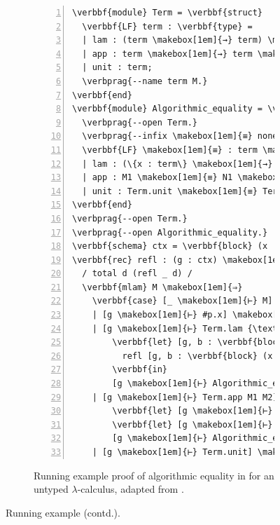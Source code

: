 \begin{figure}\ContinuedFloat
\begin{subfigure}{\linewidth}
\begin{Verbatim}[commandchars=\\\{\}, baselinestretch=1, numbers=left]
\verbbf{module} Term = \verbbf{struct}
  \verbbf{LF} term : \verbbf{type} =
  | lam : (term \makebox[1em]{→} term) \makebox[1em]{→} term
  | app : term \makebox[1em]{→} term \makebox[1em]{→} term
  | unit : term;
  \verbprag{--name term M.}
\verbbf{end}
\verbbf{module} Algorithmic_equality = \verbbf{struct}
  \verbprag{--open Term.}
  \verbprag{--infix \makebox[1em]{≡} none.}
  \verbbf{LF} \makebox[1em]{≡} : term \makebox[1em]{→} term \makebox[1em]{→} \verbbf{type} =
  | lam : (\{x : term\} \makebox[1em]{→} x \makebox[1em]{≡} x \makebox[1em]{→} M x \makebox[1em]{≡} N x) \makebox[1em]{→} Term.lam M \makebox[1em]{≡} Term.lam N
  | app : M1 \makebox[1em]{≡} N1 \makebox[1em]{→} M2 \makebox[1em]{≡} N2 \makebox[1em]{→} Term.app M1 M2 \makebox[1em]{≡} Term.app N1 N2
  | unit : Term.unit \makebox[1em]{≡} Term.unit;
\verbbf{end}
\verbprag{--open Term.}
\verbprag{--open Algorithmic_equality.}
\verbbf{schema} ctx = \verbbf{block} (x : term, eq : x \makebox[1em]{≡} x);
\verbbf{rec} refl : (g : ctx) \makebox[1em]{→} \{M : [g \makebox[1em]{⊢} term]\} \makebox[1em]{→} [g \makebox[1em]{⊢} M \makebox[1em]{≡} M] =
  / total d (refl _ d) /
  \verbbf{mlam} M \makebox[1em]{⇒}
    \verbbf{case} [_ \makebox[1em]{⊢} M] \verbbf{of}
    | [g \makebox[1em]{⊢} #p.x] \makebox[1em]{⇒} [g \makebox[1em]{⊢} #p.eq]
    | [g \makebox[1em]{⊢} Term.lam {\textbackslash}x. F] \makebox[1em]{⇒}
        \verbbf{let} [g, b : \verbbf{block} (x : term, eq : x \makebox[1em]{≡} x) \makebox[1em]{⊢} D] =
          refl [g, b : \verbbf{block} (x : term, eq : x \makebox[1em]{≡} x) \makebox[1em]{⊢} F[\monoellipsis, b.x]]
        \verbbf{in}
        [g \makebox[1em]{⊢} Algorithmic_equality.lam {\textbackslash}x. {\textbackslash}eq. D[\monoellipsis, <x; eq>]]
    | [g \makebox[1em]{⊢} Term.app M1 M2] \makebox[1em]{⇒}
        \verbbf{let} [g \makebox[1em]{⊢} D1] = refl [g \makebox[1em]{⊢} M1] \verbbf{in}
        \verbbf{let} [g \makebox[1em]{⊢} D2] = refl [g \makebox[1em]{⊢} M2] \verbbf{in}
        [g \makebox[1em]{⊢} Algorithmic_equality.app D1 D2]
    | [g \makebox[1em]{⊢} Term.unit] \makebox[1em]{⇒} [g \makebox[1em]{⊢} Algorithmic_equality.unit];
\end{Verbatim}
\caption[Algorithmic equality in \Beluga]{%
Running example proof of algorithmic equality in \Beluga for an untyped $\lambda$-calculus, adapted from \cite{felty2010reasoning}.
}
\end{subfigure}
\caption[]{Running example (contd.).}
\label{figure:running-example}
\end{figure}

